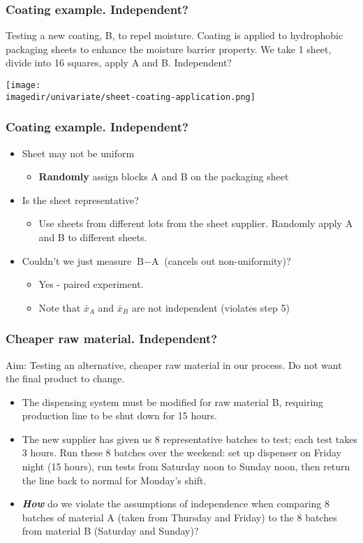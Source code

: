 \begin{frame}\frametitle{Coating example. Independent?}

	Testing a new coating, B, to repel moisture. Coating is applied to hydrophobic packaging sheets to enhance the moisture barrier property. We take 1 sheet, divide into 16 squares, apply A and B. Independent?

	\texttt{[image: \\imagedir/univariate/sheet-coating-application.png]}
\end{frame}

\begin{frame}\frametitle{Coating example. Independent?}
	\begin{itemize}
		\item Sheet may not be uniform
		\begin{itemize}
			\item \textbf{Randomly} assign blocks A and B on the packaging sheet \pause
		\end{itemize}
		\item Is the sheet representative?
		\begin{itemize}
			\item Use sheets from different lots from the sheet supplier. Randomly apply A and B to different sheets. \pause
		\end{itemize}
		\item Couldn't we just measure $\text{B} - \text{A}$ (cancels out non-uniformity)?
		\begin{itemize}
			\item Yes - paired experiment.
			\item Note that $\bar{x}_A$ and $\bar{x}_B$ are not independent (violates step 5)
		\end{itemize}
	\end{itemize}
\end{frame}

\begin{frame}\frametitle{Cheaper raw material. Independent?}

	Aim: Testing an alternative, cheaper raw material in our process. Do not want the final product to change.
	\begin{itemize}
		\item The dispensing system must be modified for raw material B, requiring production line to be shut down for 15 hours.
	\end{itemize}
	\begin{itemize}
		\item The new supplier has given us 8 representative batches to test; each test takes 3 hours. Run these 8 batches over the weekend: set up dispenser on Friday night (15 hours), run tests from Saturday noon to Sunday noon, then return the line back to normal for Monday's shift.
	\end{itemize}
	\begin{itemize}
		\item\textbf{\emph{How}} do we violate the assumptions of independence when comparing 8 batches of material A (taken from Thursday and Friday) to the 8 batches from material B (Saturday and Sunday)?
	\end{itemize}
\end{frame}


